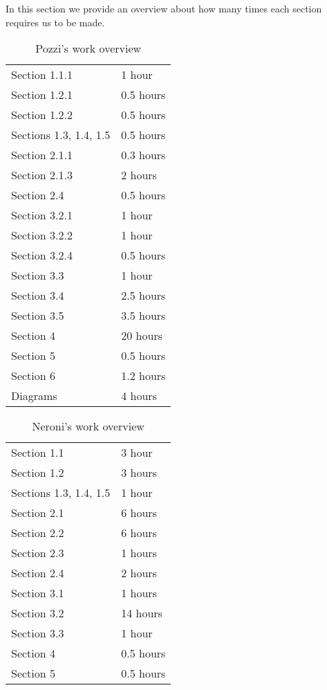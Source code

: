 In this section we provide an overview about how many times each section requires us to be made.


\begin{table} [H]
\centering
{}
{\centering
\begin{tabular}{m{2.5in}|m{.9in}}
Section 1.1.1 & 1 hour\\
Section 1.2.1 & 0.5 hours\\
Section 1.2.2 & 0.5 hours\\
Sections 1.3, 1.4, 1.5 & 0.5 hours\\
Section 2.1.1 & 0.3 hours\\
Section 2.1.3 & 2 hours\\
Section 2.4 & 0.5 hours\\
Section 3.2.1 & 1 hour\\
Section 3.2.2 & 1 hour\\
Section 3.2.4 & 0.5 hours\\
Section 3.3 & 1 hour\\
Section 3.4 & 2.5 hours\\
Section 3.5 & 3.5 hours\\
Section 4 & 20 hours\\
Section 5 & 0.5 hours\\
Section 6 & 1.2 hours\\
Diagrams & 4 hours
\end{tabular}
}
\caption{Pozzi's work overview}
\end{table}


\begin{table} [H]
\centering
{}
{\centering
\begin{tabular}{m{2.5in}|m{.9in}}
Section 1.1 & 3 hour\\
Section 1.2 & 3 hours\\
Sections 1.3, 1.4, 1.5 & 1 hour\\
Section 2.1 & 6 hours\\
Section 2.2 & 6 hours\\
Section 2.3 & 1 hours\\
Section 2.4 & 2 hours\\
Section 3.1 & 1 hours\\
Section 3.2 & 14 hours\\
Section 3.3 & 1 hour\\
Section 4 & 0.5 hours\\
Section 5 & 0.5 hours\\
\end{tabular}
}
\caption{Neroni's work overview}
\end{table}



